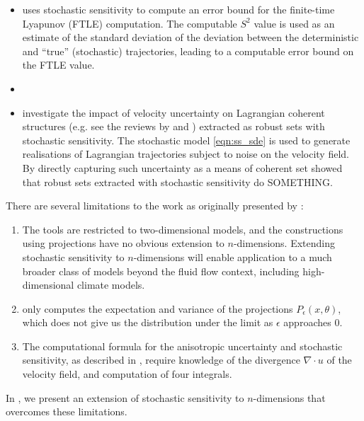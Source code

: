 \begin{itemize}
	\item \citet{Balasuriya_2020_UncertaintyFinitetimeLyapunov} uses stochastic sensitivity to compute an error bound for the finite-time Lyapunov (FTLE) computation.
	      The computable \(S^2\) value is used as an estimate of the standard deviation of the deviation between the deterministic and ``true'' (stochastic) trajectories, leading to a computable error bound on the FTLE value.


	\item \citet{FangEtAl_2020_DisentanglingResolutionPrecision}


	\item \citet{BadzaEtAl_2023_HowSensitiveAre} investigate the impact of velocity uncertainty on Lagrangian coherent structures (e.g. see the reviews by \citet{BalasuriyaEtAl_2018_GeneralizedLagrangianCoherent} and \citet{HadjighasemEtAl_2017_CriticalComparisonLagrangian}) extracted as robust sets with stochastic sensitivity.
	      The stochastic model \cref{eqn:ss_sde} is used to generate realisations of Lagrangian trajectories subject to noise on the velocity field.
	      By directly capturing such uncertainty as a means of coherent set \citet{BadzaEtAl_2023_HowSensitiveAre} showed that robust sets extracted with stochastic sensitivity do SOMETHING.

\end{itemize}
There are several limitations to the work as originally presented by \citet{Balasuriya_2020_StochasticSensitivityComputable}:
\begin{enumerate}
	\item The tools are restricted to two-dimensional models, and the constructions using projections have no obvious extension to \(n\)-dimensions.
	      Extending stochastic sensitivity to \(n\)-dimensions will enable application to a much broader class of models beyond the fluid flow context, including high-dimensional climate models.

	\item \citet{Balasuriya_2020_StochasticSensitivityComputable} only computes the expectation and variance of the projections \(P_\epsilon(x,\theta)\), which does not give us the distribution under the limit as \(\epsilon\) approaches 0.

	\item The computational formula for the anisotropic uncertainty and stochastic sensitivity, as described in , require knowledge of the divergence \(\nabla\cdot u\) of the velocity field, and computation of four integrals.
\end{enumerate}



In , we present an extension of stochastic sensitivity to \(n\)-dimensions that overcomes these limitations.
